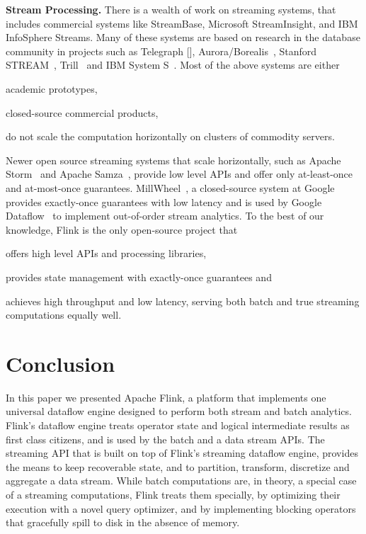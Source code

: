 \documentclass[11pt]{article}
\begin{document}
\textbf{Stream Processing.} There is a wealth of work on streaming systems, that includes commercial systems like StreamBase, Microsoft StreamInsight, and IBM InfoSphere Streams. Many of these systems are based on research in the database community in projects such as Telegraph [], Aurora/Borealis~\cite{abadi2005design}, Stanford STREAM~\cite{arasu2004stream}, Trill~\cite{chandramouli2014trill} and IBM System S~\cite{chandramouli2014trill}. Most of the above systems are either
\begin{inparaenum}[i)]
  \item academic prototypes,
  \item closed-source commercial products,
  \item do not scale the computation horizontally on clusters of commodity servers.
\end{inparaenum}
Newer open source streaming systems that scale horizontally, such as Apache Storm~\cite{CUSTOM:web/Storm} and Apache Samza~\cite{CUSTOM:web/Samza}, provide low level APIs and offer only at-least-once and at-most-once guarantees. MillWheel~\cite{akidau2013millwheel}, a closed-source system at Google provides exactly-once guarantees with low latency and is used by Google Dataflow~\cite{akidau2015dataflow} to implement  out-of-order stream analytics. To the best of our knowledge, Flink is the only open-source project that
\begin{inparaenum}[i)]
  \item offers high level APIs and processing libraries,
  \item provides state management with exactly-once guarantees and
  \item achieves high throughput and low latency, serving both batch and true streaming computations equally well.
\end{inparaenum}

\section{Conclusion}

In this paper we presented Apache Flink, a platform that implements one universal dataflow engine designed to perform both stream and batch analytics. Flink's dataflow engine treats operator state and logical intermediate results as first class citizens, and is used by the batch and a data stream APIs. The streaming API that is built on top of  Flink's streaming dataflow engine, provides the means to keep recoverable state, and to partition, transform, discretize and aggregate a data stream. While batch computations are, in theory, a special case of a streaming computations, Flink treats them specially, by optimizing their execution with a novel query optimizer, and by implementing blocking operators that gracefully spill to disk in the absence of memory. 



\end{document}

